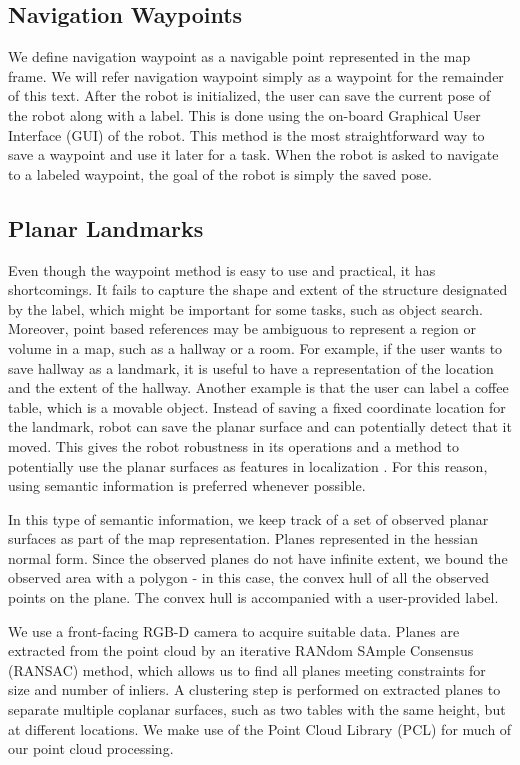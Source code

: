 \subsection{Navigation Waypoints}
\label{sec:map_waypoints}

We define navigation waypoint as a navigable point represented in the map frame. We will refer navigation waypoint simply as a waypoint for the remainder of this text. After the robot is initialized, the user can save the current pose of the robot along with a label. This is done using the on-board Graphical User Interface (GUI) of the robot. This method is the most straightforward way to save a waypoint and use it later for a task. When the robot is asked to navigate to a labeled waypoint, the goal of the robot is simply the saved pose.



\subsection{Planar Landmarks}
\label{sec:map_landmarks}

Even though the waypoint method is easy to use and practical, it has shortcomings. It fails to capture the shape and extent of the structure designated by the label, which might be important for some tasks, such as object search. Moreover, point based references may be ambiguous to represent a region or volume in a map, such as a hallway or a room. For example, if the user wants to save hallway as a
landmark, it is useful to have a representation of the location
and the extent of the hallway. Another example is that the
user can label a coffee table, which is a movable object.
Instead of saving a fixed coordinate location for the landmark,
robot can save the planar surface and can potentially
detect that it moved. This gives the robot robustness in its operations and a method to potentially use the planar surfaces as features in localization \cite{trevor2012planar}. For this reason, using semantic information is preferred whenever possible.

In this type of semantic information, we keep track of a set of observed planar surfaces as part of the map representation. Planes represented in the hessian normal form. Since the observed planes do not have infinite extent, we bound the observed area with a polygon - in this case, the convex hull of all the observed points on the plane. The convex hull is accompanied with a user-provided label. 

We use a front-facing RGB-D camera to acquire suitable data. Planes are extracted from the point cloud by an iterative RANdom SAmple Consensus (RANSAC) method, which allows us to find all planes meeting constraints for size and number of inliers. A clustering step is performed on extracted planes to separate multiple coplanar surfaces, such as two tables with
the same height, but at different locations. We make use of the Point Cloud Library (PCL) \cite{rusu20113d} for much of our point cloud processing.

